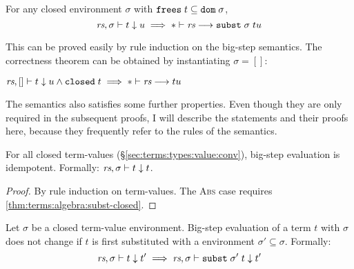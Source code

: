\begin{lemma}
  For any closed environment $\sigma$ with $\texttt{\textup{frees}}\;t \subseteq \texttt{\textup{dom}}\;\sigma$,
  \[ \textit{rs}, \sigma \vdash t \downarrow u \implies * \vdash \textit{rs} \longrightarrow \texttt{\textup{subst}}\;\sigma\;t{u} \]
\end{lemma}

\noindent
This can be proved easily by rule induction on the big-step semantics.
The correctness theorem can be obtained by instantiating $\sigma = []$:

\begin{theorem}[Correctness]
  \label{thm:intermediate:bigstep}
  $\textit{rs}, [] \vdash t \downarrow u \wedge \texttt{\textup{closed}}\;t \implies * \vdash \textit{rs} \longrightarrow t{u}$
\end{theorem}

\noindent
The semantics also satisfies some further properties.
Even though they are only required in the subsequent proofs, I will describe the statements and their proofs here, because they frequently refer to the rules of the semantics.

\begin{lemma}[Idempotence]\label{thm:intermediate:bigstep:idem}
  For all closed term-values (§\ref{sec:terms:types:value:conv}), big-step evaluation is idempotent.
  Formally: $\textit{rs}, \sigma \vdash t \downarrow t$.
\end{lemma}

\begin{proof}
  By rule induction on term-values.
  The \textsc{Abs} case requires \cref{thm:terms:algebra:subst-closed}.
\end{proof}

\begin{lemma}\label{thm:intermediate:bigstep:pre}
  Let $\sigma$ be a closed term-value environment.
  Big-step evaluation of a term $t$ with $\sigma$ does not change if $t$ is first substituted with a environment $\sigma' \subseteq \sigma$.
  Formally:
  \[\textit{rs}, \sigma \vdash t \downarrow t' \implies \textit{rs}, \sigma \vdash \texttt{\textup{subst}}\;\sigma'\;t \downarrow t'\]
\end{lemma}

